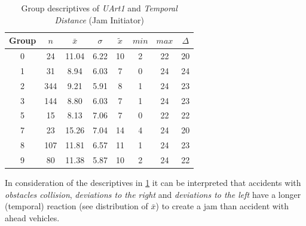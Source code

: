 \begin{table}[ht!]
	\tiny
	\centering
    \begin{tabular}{c|c|c|c|c|c|c|c}
        \toprule
        Group & $n$ & $\bar{x}$ & $\sigma$ & $\tilde{x}$ & $min$ & $max$ & $\Delta$ \\
        \midrule
        0 & 24  & 11.04 & 6.22 & 10 & 2  & 22 & 20 \\ 
        1 & 31  & 8.94  & 6.03 & 7  & 0  & 24 & 24 \\ 
        2 & 344 & 9.21  & 5.91 & 8  & 1  & 24 & 23 \\ 
        3 & 144 & 8.80  & 6.03 & 7  & 1  & 24 & 23 \\ 
        5 & 15  & 8.13  & 7.06 & 7  & 0  & 22 & 22 \\ 
        7 & 23  & 15.26 & 7.04 & 14 & 4  & 24 & 20 \\ 
        8 & 107 & 11.81 & 6.57 & 11 & 1  & 24 & 23 \\ 
        9 & 80  & 11.38 & 5.87 & 10 & 2  & 24 & 22 \\ 
        \bottomrule
      \end{tabular}
    \caption{Group descriptives of \textit{UArt1} and \textit{Temporal Distance} (Jam Initiator)}
    \label{tbl:descriptives_baysis_initiator_UArt_TDist}
\end{table}
In consideration of the descriptives in \cref{tbl:descriptives_baysis_initiator_UArt_TDist} it can be interpreted that accidents with \textit{obstacles collision}, \textit{deviations to the right} and \textit{deviations to the left} have a longer (temporal) reaction (see distribution of $\bar{x}$) to create a jam than accident with ahead vehicles.

